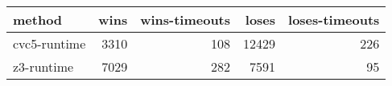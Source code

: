 \begin{tabular}{lrrrr}
\hline
 method       &   wins &   wins-timeouts &   loses &   loses-timeouts \\
\hline
 cvc5-runtime &   3310 &             108 &   12429 &              226 \\
 z3-runtime   &   7029 &             282 &    7591 &               95 \\
\hline
\end{tabular}
